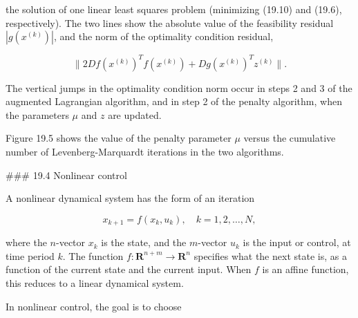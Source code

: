 the solution of one linear least squares problem (minimizing (19.10) and (19.6), respectively). The two lines show the absolute value of the feasibility residual \(|g(x^{(k)})|\), and the norm of the optimality condition residual,

\[\|2Df(x^{(k)})^{T}f(x^{(k)})+Dg(x^{(k)})^{T}z^{(k)}\|.\]

The vertical jumps in the optimality condition norm occur in steps 2 and 3 of the augmented Lagrangian algorithm, and in step 2 of the penalty algorithm, when the parameters \(\mu\) and \(z\) are updated.

Figure 19.5 shows the value of the penalty parameter \(\mu\) versus the cumulative number of Levenberg-Marquardt iterations in the two algorithms.

### 19.4 Nonlinear control

A nonlinear dynamical system has the form of an iteration

\[x_{k+1}=f(x_{k},u_{k}),\quad k=1,2,\ldots,N,\]

where the \(n\)-vector \(x_{k}\) is the state, and the \(m\)-vector \(u_{k}\) is the input or control, at time period \(k\). The function \(f:\mathbf{R}^{n+m}\rightarrow\mathbf{R}^{n}\) specifies what the next state is, as a function of the current state and the current input. When \(f\) is an affine function, this reduces to a linear dynamical system.

In nonlinear control, the goal is to choose 